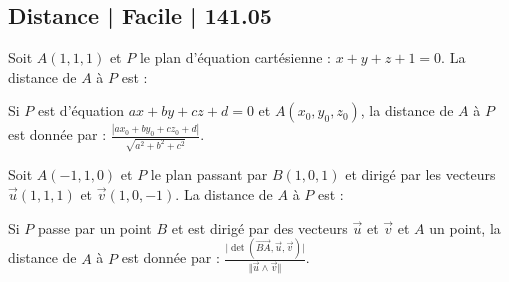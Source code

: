 \subsection{Distance | Facile | 141.05}

\begin{question}
  
Soit $A(1,1,1)$ et $P$ le plan d'équation cartésienne : $x+y+z+1=0$. La distance de $A$ à $P$ est : 
\begin{answers}


 
   

\end{answers}
\begin{explanations}
Si $P$ est d'équation  $ax+by+cz+d=0$ et $A(x_0,y_0,z_0)$, la distance de $A$ à $P$ est donnée par : $\frac{|ax_0+by_0+cz_0+d|}{\sqrt{a^2+b^2+c^2}}$.
\end{explanations}

\end{question}


\begin{question}

Soit $A(-1,1,0)$ et $P$ le plan passant par $B(1,0,1)$ et dirigé par les vecteurs $\vec{u}(1,1,1)$ et $\vec{v}(1,0,-1)$. La distance de $A$ à $P$ est : 
\begin{answers}


 
   

\end{answers}
\begin{explanations}
Si $P$ passe par un point $B$ et est dirigé par des vecteurs $\vec{u}$ et $\vec{v}$ et $A$ un point, la distance de $A$ à $P$ est donnée par : $\frac{ \vert \det (\overrightarrow{BA}, \vec{u},\vec{v})\vert}{\Vert \vec{u} \wedge \vec{v}\Vert}$.
\end{explanations}

\end{question}



